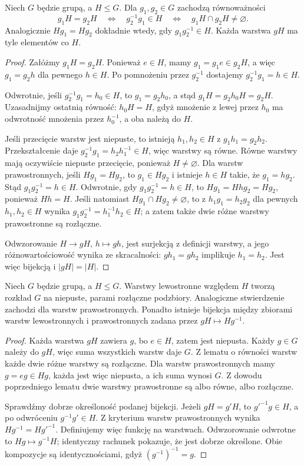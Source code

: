 \begin{lemat}
\label{aa:lem:rowne-warstwy}
Niech $G$ będzie grupą, a $H\le G$. Dla $g_1,g_2\in G$
zachodzą równoważności
\[
 g_1H=g_2H \quad\Longleftrightarrow\quad
 g_2^{-1}g_1\in H\quad\Longleftrightarrow\quad
 g_1H\cap g_2H\ne\varnothing.
\]
Analogicznie $Hg_1=Hg_2$ dokładnie wtedy, gdy
$g_1g_2^{-1}\in H$. Każda warstwa $gH$ ma tyle elementów co $H$.
\end{lemat}
\begin{proof}
Załóżmy $g_1H=g_2H$. Ponieważ $e\in H$, mamy
$g_1=g_1e\in g_2H$, a więc $g_1=g_2h$ dla pewnego $h\in H$.
Po pomnożeniu przez $g_2^{-1}$ dostajemy $g_2^{-1}g_1=h\in H$.

Odwrotnie, jeśli $g_2^{-1}g_1=h_0\in H$, to $g_1=g_2h_0$,
a stąd $g_1H=g_2h_0H=g_2H$. Uzasadnijmy ostatnią równość:
$h_0H=H$, gdyż mnożenie z lewej przez $h_0$ ma odwrotność
mnożenia przez $h_0^{-1}$, a oba należą do $H$.

Jeśli przecięcie warstw jest niepuste, to istnieją
$h_1,h_2\in H$ z $g_1h_1=g_2h_2$.
Przekształcenie daje $g_2^{-1}g_1=h_2h_1^{-1}\in H$,
więc warstwy są równe. Równe warstwy mają oczywiście
niepuste przecięcie, ponieważ $H\ne\varnothing$.
Dla warstw prawostronnych, jeśli $Hg_1=Hg_2$, to
$g_1\in Hg_2$ i istnieje $h\in H$ takie, że $g_1=hg_2$.
Stąd $g_1g_2^{-1}=h\in H$. Odwrotnie, gdy
$g_1g_2^{-1}=h\in H$, to $Hg_1=Hhg_2=Hg_2$,
ponieważ $Hh=H$. Jeśli natomiast $Hg_1\cap Hg_2\ne\varnothing$,
to z $h_1g_1=h_2g_2$ dla pewnych $h_1,h_2\in H$
wynika $g_1g_2^{-1}=h_1^{-1}h_2\in H$;
a zatem także dwie różne warstwy prawostronne są rozłączne.

Odwzorowanie $H\to gH$, $h\mapsto gh$, jest surjekcją
z definicji warstwy, a jego różnowartościowość wynika
ze skracalności: $gh_1=gh_2$ implikuje $h_1=h_2$.
Jest więc bijekcją i $|gH|=|H|$.
\end{proof}

\begin{twierdzenie}
\label{aa:tw:podzial-warstwy}
Niech $G$ będzie grupą, a $H\le G$. Warstwy lewostronne
względem $H$ tworzą rozkład $G$ na niepuste, parami rozłączne
podzbiory. Analogiczne stwierdzenie zachodzi dla warstw prawostronnych.
Ponadto istnieje bijekcja między zbiorami warstw lewostronnych
i prawostronnych zadana przez $gH\mapsto Hg^{-1}$.
\end{twierdzenie}
\begin{proof}
Każda warstwa $gH$ zawiera $g$, bo $e\in H$, zatem jest niepusta.
Każdy $g\in G$ należy do $gH$, więc suma wszystkich warstw daje $G$.
Z lematu o równości warstw każde dwie różne warstwy są rozłączne.
Dla warstw prawostronnych mamy $g=eg\in Hg$, każda jest więc
niepusta, a ich suma wynosi $G$. Z dowodu poprzedniego lematu
dwie warstwy prawostronne są albo równe, albo rozłączne.

Sprawdźmy dobrze określoność podanej bijekcji.
Jeżeli $gH=g'H$, to $g'^{-1}g\in H$,
a po odwróceniu $g^{-1}g'\in H$.
Z kryterium warstw prawostronnych wynika
$Hg^{-1}=Hg'^{-1}$. Definiujemy więc funkcję na warstwach.
Odwzorowanie odwrotne to $Hg\mapsto g^{-1}H$;
identyczny rachunek pokazuje, że jest dobrze określone.
Obie kompozycje są identycznościami, gdyż $(g^{-1})^{-1}=g$.
\end{proof}

